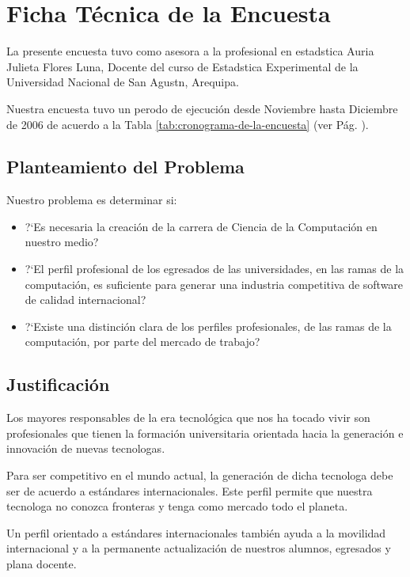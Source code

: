 \section{Ficha Técnica de la Encuesta}\label{sec:cs-ficha-tecnica-de-la-encuesta}

La presente encuesta tuvo como asesora a la profesional en estad­stica Auria Julieta Flores Luna, Docente del curso de Estad­stica Experimental de la Universidad Nacional de San Agust­n, Arequipa. 

Nuestra encuesta tuvo un per­odo de ejecución desde Noviembre hasta Diciembre de 2006 de acuerdo a la Tabla \ref{tab:cronograma-de-la-encuesta} (ver Pág. \pageref{tab:cronograma-de-la-encuesta}).

\subsection{Planteamiento del Problema}
Nuestro problema es determinar si: 

\begin{itemize}
\item ?`Es necesaria la creación de la carrera de Ciencia de la Computación en nuestro medio?
\item ?`El perfil profesional de los egresados de las universidades, en las ramas de la computación, es suficiente para generar una industria competitiva de software de calidad internacional?
\item ?`Existe una distinción clara de los perfiles profesionales, de las ramas de la computación, por parte del mercado de trabajo?
\end{itemize}

\subsection{Justificación}
Los mayores responsables de la era tecnológica que nos ha tocado vivir son profesionales que tienen la formación universitaria orientada hacia la generación e innovación de nuevas tecnolog­as.

Para ser competitivo en el mundo actual, la generación de dicha tecnolog­a debe ser de acuerdo a estándares internacionales. Este perfil permite que nuestra tecnolog­a no conozca fronteras y tenga como mercado todo el planeta.

Un perfil orientado a estándares internacionales también ayuda a la movilidad internacional y a la permanente actualización de nuestros alumnos, egresados y plana docente.

